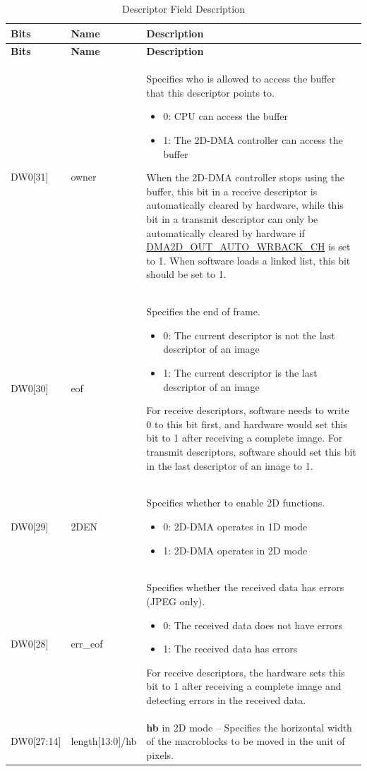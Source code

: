 \documentclass[main\_\_EN.tex]{subfiles}
\begin{document}
\begin{longtable}[c]{|m{1.8cm}|m{2.5cm}|L{10.2cm}|}
\caption{Descriptor Field Description} \label{tab:2ddma-dw}\\\hline
{}
\textbf{Bits} & \textbf{Name} & \textbf{Description} \\\hline
\endfirsthead
\hline
{}
\textbf{Bits} & \textbf{Name} & \textbf{Description} \\\hline
\endhead
\endfoot

DW0[31] & owner & Specifies who is allowed to access the buffer that this descriptor points to.
    \begin{itemize}
        \item 0: CPU can access the buffer
        \item 1: The 2D-DMA controller can access the buffer
    \end{itemize}
    When the 2D-DMA controller stops using the buffer, this bit in a receive descriptor is automatically cleared by hardware, while this bit in a transmit descriptor can only be automatically cleared by hardware if \hyperref[fielddesc:DMA2DOUTAUTOWRBACKCHN]{DMA2D\_OUT\_AUTO\_WRBACK\_CH} is set to 1. When software loads a linked list, this bit should be set to 1. \\\hline
DW0[30] & eof & Specifies the end of frame.
    \begin{itemize}
        \item 0: The current descriptor is not the last descriptor of an image
        \item 1: The current descriptor is the last descriptor of an image
    \end{itemize}
    For receive descriptors, software needs to write 0 to this bit first, and hardware would set this bit to 1 after receiving a complete image. For transmit descriptors, software should set this bit in the last descriptor of an image to 1. \\\hline
DW0[29] & 2DEN & Specifies whether to enable 2D functions.
    \begin{itemize}
        \item 0: 2D-DMA operates in 1D mode
        \item 1: 2D-DMA operates in 2D mode
        \vspace{-1.5em}
    \end{itemize}
    \\\hline
DW0[28] & err\_eof & Specifies whether the received data has errors (JPEG only).
    \begin{itemize}
        \item 0: The received data does not have errors
        \item 1: The received data has errors
    \end{itemize}
    For receive descriptors, the hardware sets this bit to 1 after receiving a complete image and detecting errors in the received data. \\\hline
DW0[27:14] & length[13:0]/hb &  \textbf{hb} in 2D mode -- Specifies the horizontal width of the macroblocks to be moved in the unit of pixels.


\end{longtable}
\end{document}
